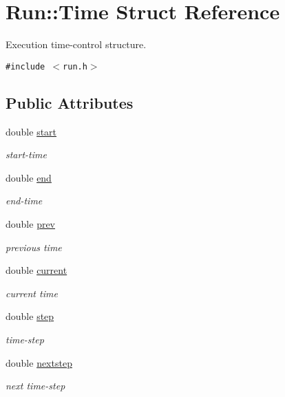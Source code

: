 \hypertarget{structRun_1_1Time}{
\section{Run::Time Struct Reference}
\label{structRun_1_1Time}
}
Execution time-control structure.  


{\tt \#include $<$run.h$>$}

\subsection*{Public Attributes}
\begin{CompactItemize}
\item 
double \hyperlink{structRun_1_1Time_0e7fe62ba04bf096677fb4cbb3f01d69}{start}
\begin{CompactList}\small\item\em start-time \item\end{CompactList}\item 
double \hyperlink{structRun_1_1Time_7cffeec5b6e31da1fa8c3edbea5ec35c}{end}
\begin{CompactList}\small\item\em end-time \item\end{CompactList}\item 
double \hyperlink{structRun_1_1Time_fa811a22c98d81c237a8079ac1e895c3}{prev}
\begin{CompactList}\small\item\em previous time \item\end{CompactList}\item 
double \hyperlink{structRun_1_1Time_e620752b0a0b7f8f5bf209ae4c978aad}{current}
\begin{CompactList}\small\item\em current time \item\end{CompactList}\item 
double \hyperlink{structRun_1_1Time_5459d9ad262952019c1d4e45acba4b77}{step}
\begin{CompactList}\small\item\em time-step \item\end{CompactList}\item 
double \hyperlink{structRun_1_1Time_71d418b85f36a6ee0f2f9410b8c8025e}{nextstep}
\begin{CompactList}\small\item\em next time-step \item\end{CompactList}\item 

\end{CompactItemize}
